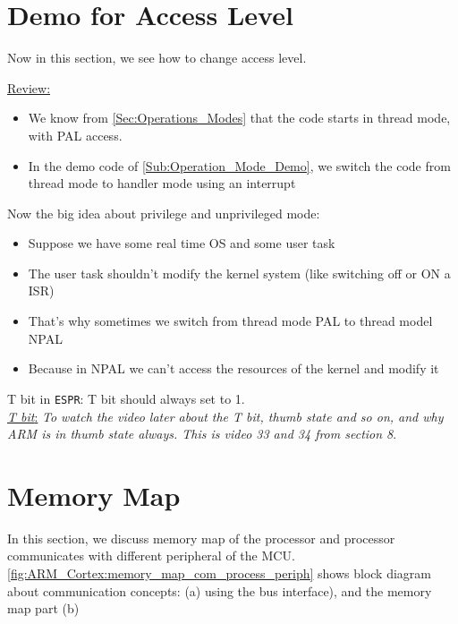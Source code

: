 \newpage

\section{Demo for Access Level}

Now in this section, we see how to change access level.

\underline{Review:}

\begin{itemize}
    \item We know from \autoref{Sec:Operations_Modes} that the code starts in thread mode, with PAL access.


    \item In the demo code of \ref{Sub:Operation_Mode_Demo}, we switch the code from thread mode to handler mode using an interrupt
\end{itemize}


Now the big idea about privilege and unprivileged mode:

\begin{itemize}
    \item Suppose we have some real time OS and some user task

    \item The user task shouldn't modify the kernel system (like switching off or ON a ISR)


    \item That's why sometimes we switch from thread mode PAL to thread model NPAL

    \item Because in NPAL we can't access the resources of the kernel and modify it
    
\end{itemize}

T bit in \verb|ESPR|: T bit should always set to 1.\\

 \underline{\textit{T bit}:} \textit{To watch the video later about the T bit, thumb state and so on, and why ARM is in thumb state always. This is video 33 and 34 from section 8}. 

\newpage
\section{Memory Map}

In this section, we discuss memory map of the processor and processor communicates with different peripheral of the MCU. \autoref{fig:ARM_Cortex:memory_map_com_process_periph} shows block diagram about communication concepts: (a) using the bus interface), and the memory map part (b)

